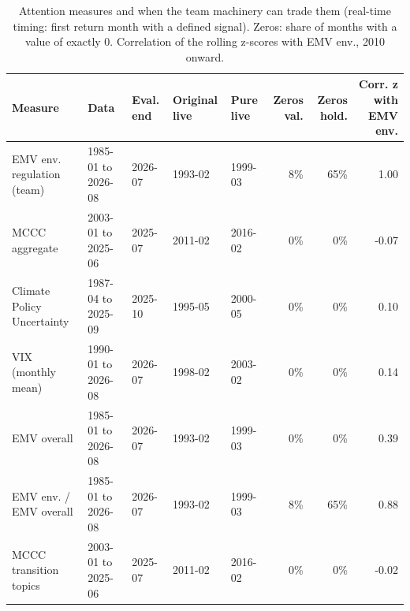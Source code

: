 \begin{table}[htbp]
\centering
\footnotesize
\caption{Attention measures and when the team machinery can trade them (real-time timing: first return month with a defined signal). Zeros: share of months with a value of exactly 0. Correlation of the rolling z-scores with EMV env., 2010 onward.}
\label{tab:m1b_availability}
\begin{tabular}{lllllrrr}
\toprule
Measure & Data & Eval. end & Original live & Pure live & Zeros val. & Zeros hold. & Corr. z with EMV env. \\
\midrule
EMV env. regulation (team) & 1985-01 to 2026-08 & 2026-07 & 1993-02 & 1999-03 & 8\% & 65\% & 1.00 \\
MCCC aggregate & 2003-01 to 2025-06 & 2025-07 & 2011-02 & 2016-02 & 0\% & 0\% & -0.07 \\
Climate Policy Uncertainty & 1987-04 to 2025-09 & 2025-10 & 1995-05 & 2000-05 & 0\% & 0\% & 0.10 \\
VIX (monthly mean) & 1990-01 to 2026-08 & 2026-07 & 1998-02 & 2003-02 & 0\% & 0\% & 0.14 \\
EMV overall & 1985-01 to 2026-08 & 2026-07 & 1993-02 & 1999-03 & 0\% & 0\% & 0.39 \\
EMV env. / EMV overall & 1985-01 to 2026-08 & 2026-07 & 1993-02 & 1999-03 & 8\% & 65\% & 0.88 \\
MCCC transition topics & 2003-01 to 2025-06 & 2025-07 & 2011-02 & 2016-02 & 0\% & 0\% & -0.02 \\
\bottomrule
\end{tabular}
\end{table}
